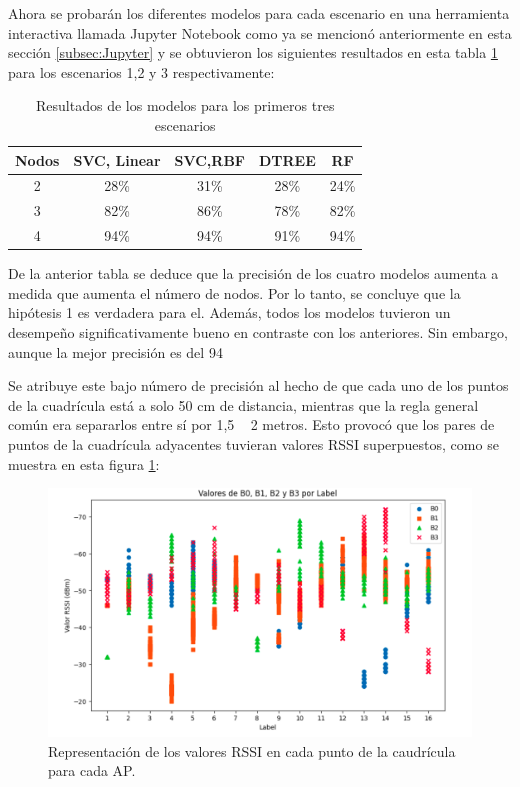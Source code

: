 Ahora se probarán los diferentes modelos para cada escenario en una herramienta interactiva llamada Jupyter Notebook como ya se mencionó anteriormente en esta sección \ref{subsec:Jupyter} y se obtuvieron los siguientes resultados en esta tabla \ref{cuadro:tabla2} para los escenarios 1,2 y 3 respectivamente:


\begin{table}[H]
\begin{center}
\begin{tabular}{|c|c|c|c|c|}
\hline
\textbf{Nodos} & \textbf{SVC, Linear} & \textbf{SVC,RBF} & \textbf{DTREE} & \textbf{RF} \\
\hline
2 & 28\% & 31\% & 28\% & 24\% \\  
3 & 82\% & 86\% & 78\% & 82\% \\   
4 & 94\% & 94\% & 91\% & 94\% \\   
\hline
\end{tabular}
\caption{Resultados de los modelos para los primeros tres escenarios}
\label{cuadro:tabla2}
\end{center}
\end{table}


De la anterior tabla se deduce que la precisión de los cuatro modelos aumenta a medida que aumenta el número de nodos. Por lo tanto, se concluye que la hipótesis 1 es verdadera para el. Además, todos los modelos tuvieron un desempeño significativamente bueno en contraste con los anteriores. Sin embargo, aunque la mejor precisión es del 94%

Se atribuye este bajo número de precisión al hecho de que cada uno de los puntos de la cuadrícula está a solo 50 cm de distancia, mientras que la regla general común era separarlos entre sí por 1,5 ~ 2 metros. Esto provocó que los pares de puntos de la cuadrícula adyacentes tuvieran valores RSSI superpuestos, como se muestra en esta figura \ref{fig:vals1}:



\begin{figure}[H]
  \centering
  \includegraphics[scale=0.4]{figs/vals1} %
  \caption{ Representación de los valores RSSI en cada punto de la caudrícula para cada AP.}
  \label{fig:vals1}
\end{figure} 

